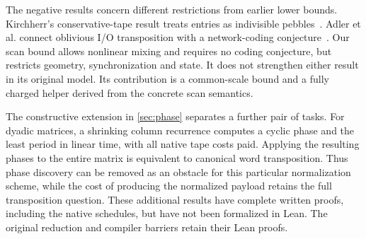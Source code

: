 The negative results concern different restrictions from earlier lower
bounds. Kirchherr's conservative-tape result treats entries as indivisible
pebbles~\cite{Kirchherr1988}. Adler et al. connect oblivious I/O transposition
with a network-coding conjecture~\cite[Section~6]{Adler2006}. Our scan bound
allows nonlinear mixing and requires no coding conjecture, but restricts
geometry, synchronization and state. It does not strengthen either result in its original model. Its contribution is a common-scale bound
and a fully charged helper derived from the concrete scan semantics.

The constructive extension in \cref{sec:phase} separates a further pair of
tasks. For dyadic matrices, a shrinking column recurrence computes a cyclic
phase and the least period in linear time, with all native tape costs paid.
Applying the resulting phases to the entire matrix is equivalent to canonical
word transposition. Thus phase discovery can be removed as an obstacle for
this particular normalization scheme, while the cost of producing the
normalized payload retains the full transposition question. These additional
results have complete written proofs, including the native schedules, but
have not been formalized in Lean. The original reduction and compiler
barriers retain their Lean proofs.
